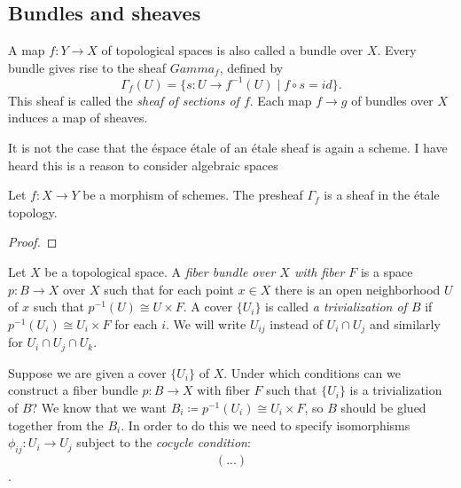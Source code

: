 \subsection{Bundles and sheaves}

A map $f: Y \to X$ of topological spaces is also called a bundle over $X$. Every bundle gives rise to the sheaf $Gamma_f$, defined by
\[
    \Gamma_f(U)	= \{ s : U \to f^{-1}(U) \mid f \circ s = id \}.
\]
This sheaf is called the \textit{sheaf of sections of $f$}. Each map $f \to g$ of bundles over $X$ induces a map of sheaves.
\begin{remark}
	It is not the case that the \'espace \'etale of an \'etale sheaf is again a scheme. I have heard this is a reason to consider algebraic spaces
\end{remark}

\begin{proposition}
	Let $f: X \to Y$ be a morphism of schemes. The presheaf $\Gamma_f$ is a sheaf in the \'etale topology.
\end{proposition}
\begin{proof}
	
\end{proof}

\begin{definition}
	Let $X$ be a topological space. A \textit{fiber bundle over $X$ with fiber $F$} is a space $p: B \to X$ over $X$ such that for each point $x \in X$ there is an open neighborhood $U$ of $x$ such that $p^{-1}(U) \cong U \times F$. A cover $\{U_i\}$ is called \textit{a trivialization of $B$} if $p^{-1}(U_i) \cong U_i \times F$ for each $i$. We will write $U_{ij}$ instead of $U_i \cap U_j$ and similarly for $U_i \cap U_j \cap U_k$.
\end{definition}
\begin{remark}
	Suppose we are given a cover $\{U_i\}$ of $X$. Under which conditions can we construct a fiber bundle $p: B \to X$ with fiber $F$ such that $\{U_i\}$ is a trivialization of $B$? We know that we want $B_i \coloneqq p^{-1}(U_i)\cong U_i \times F $, so $B$ should be glued together from the $B_i$. In order to do this we need to specify isomorphisms $\phi_{ij} : U_i \to U_j$ subject to the \textit{cocycle condition}:
	\[(...)\]
	.
\end{remark}

